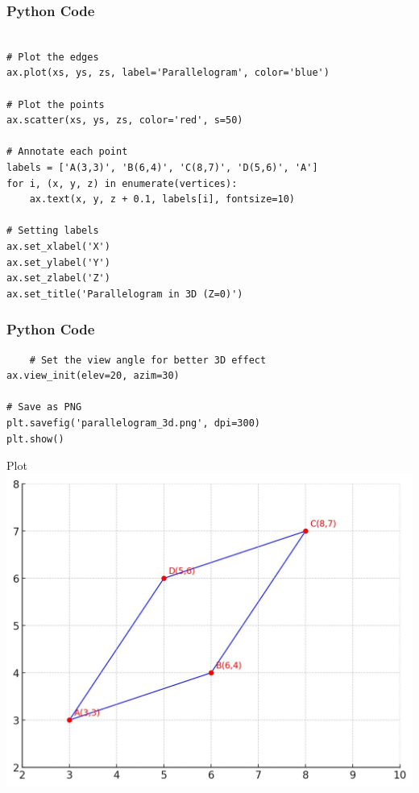 \documentclass{beamer}
\begin{document}
\begin{frame}[fragile]
    \frametitle{Python Code }
    \begin{lstlisting}
    
# Plot the edges
ax.plot(xs, ys, zs, label='Parallelogram', color='blue')

# Plot the points
ax.scatter(xs, ys, zs, color='red', s=50)

# Annotate each point
labels = ['A(3,3)', 'B(6,4)', 'C(8,7)', 'D(5,6)', 'A']
for i, (x, y, z) in enumerate(vertices):
    ax.text(x, y, z + 0.1, labels[i], fontsize=10)

# Setting labels
ax.set_xlabel('X')
ax.set_ylabel('Y')
ax.set_zlabel('Z')
ax.set_title('Parallelogram in 3D (Z=0)')
     \end{lstlisting}

\end{frame}
\begin{frame}[fragile]
    \frametitle{Python Code }
    \begin{lstlisting}
    # Set the view angle for better 3D effect
ax.view_init(elev=20, azim=30)

# Save as PNG
plt.savefig('parallelogram_3d.png', dpi=300)
plt.show()
   \end{lstlisting}

\end{frame}
\begin{frame}{Plot}
    \centering
    \includegraphics[width=\columnwidth, height=0.8\textheight, keepaspectratio]{Figs/Img.jpg}     
\end{frame}
\end{document}

